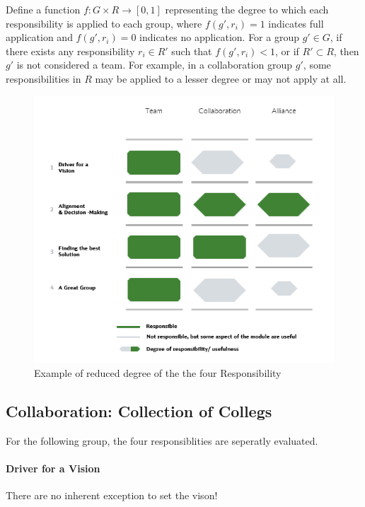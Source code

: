 Define a function $ f: G \times R \rightarrow [0, 1] $ representing the degree to which each responsibility is applied to each group, where $ f(g', r_i) = 1 $ indicates full application and $ f(g', r_i) = 0 $ indicates no application. For a group $ g' \in G $, if there exists any responsibility $ r_i \in R' $ such that $ f(g', r_i) < 1 $, or if $ R' \subset R $, then $ g' $ is not considered a team. For example, in a collaboration group $ g' $, some responsibilities in $ R $ may be applied to a lesser degree or may not apply at all.


\begin{figure}[H]
	\centering
	\includegraphics[scale = 0.5]{attachment/chapter_OWN/Rubric_LR_Degree_of_Responsiblity}
	\caption{Example of reduced degree of the the four Responsibility}
\end{figure}




\subsection{Collaboration: Collection of Collegs}
For the following group, the four responsiblities are seperatly evaluated. 

\paragraph{Driver for a Vision}

There are no inherent exception to set the vison!\\



